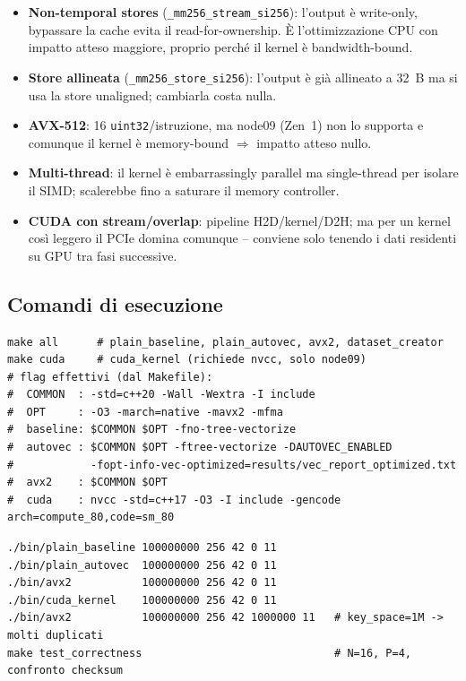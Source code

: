 \documentclass[11pt,a4paper]{article}
\begin{document}
\begin{itemize}
  \item \textbf{Non-temporal stores} (\texttt{\_mm256\_stream\_si256}): l'output è write-only, bypassare la cache evita il read-for-ownership. È l'ottimizzazione CPU con impatto atteso maggiore, proprio perché il kernel è bandwidth-bound.
  \item \textbf{Store allineata} (\texttt{\_mm256\_store\_si256}): l'output è già allineato a 32~B ma si usa la store unaligned; cambiarla costa nulla.
  \item \textbf{AVX-512}: 16 \texttt{uint32}/istruzione, ma node09 (Zen~1) non lo supporta e comunque il kernel è memory-bound $\Rightarrow$ impatto atteso nullo.
  \item \textbf{Multi-thread}: il kernel è embarrassingly parallel ma single-thread per isolare il SIMD; scalerebbe fino a saturare il memory controller.
  \item \textbf{CUDA con stream/overlap}: pipeline H2D/kernel/D2H; ma per un kernel così leggero il PCIe domina comunque -- conviene solo tenendo i dati residenti su GPU tra fasi successive.
\end{itemize}

\subsection{Comandi di esecuzione}

\begin{lstlisting}[style=bash, caption={Build (Makefile reale). Su x86\_64 compila anche avx2.}]
make all      # plain_baseline, plain_autovec, avx2, dataset_creator
make cuda     # cuda_kernel (richiede nvcc, solo node09)
# flag effettivi (dal Makefile):
#  COMMON  : -std=c++20 -Wall -Wextra -I include
#  OPT     : -O3 -march=native -mavx2 -mfma
#  baseline: $COMMON $OPT -fno-tree-vectorize
#  autovec : $COMMON $OPT -ftree-vectorize -DAUTOVEC_ENABLED
#            -fopt-info-vec-optimized=results/vec_report_optimized.txt
#  avx2    : $COMMON $OPT
#  cuda    : nvcc -std=c++17 -O3 -I include -gencode arch=compute_80,code=sm_80
\end{lstlisting}

\begin{lstlisting}[style=bash, caption={Esecuzione. Firma CLI: ./bin/<binario> N P [seed] [key\_space] [reps].}]
./bin/plain_baseline 100000000 256 42 0 11
./bin/plain_autovec  100000000 256 42 0 11
./bin/avx2           100000000 256 42 0 11
./bin/cuda_kernel    100000000 256 42 0 11
./bin/avx2           100000000 256 42 1000000 11   # key_space=1M -> molti duplicati
make test_correctness                              # N=16, P=4, confronto checksum
\end{lstlisting}
\end{document}
